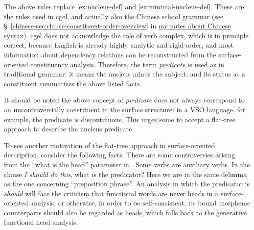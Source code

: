 \documentclass{article}
\newcommand*{\citesec}[1]{\S~{#1}}
\newcommand*{\term}[1]{\emph{#1}}
\newcommand*{\corpus}[1]{\emph{#1}}
\newcommand{\chinese}{\href{../Chinese/main.pdf}{my notes about Chinese syntax}}
\begin{document}
The above rules replace \eqref{ex:nucleus-def} and \eqref{ex:minimal-nucleus-def}.
These are the rules used in \ac{cgel}, and actually also the Chinese school grammar
(see \citesec{\ref{chinese-sec:clause-constituent-order-overview}} in \chinese).
\ac{cgel} does not acknowledge the role of verb complex,
which is in principle correct, 
because English is already highly analytic and rigid-order,
and most information about dependency relations can be reconstructed 
from the surface-oriented constituency analysis.
Therefore, the term \term{predicate} is used as in traditional grammar:
it means the nucleus minus the subject, 
and its status as a constituent summarizes the above listed facts.

It should be noted the above concept of \term{predicate} does not always correspond to 
an uncontroversially constituent in the surface structure:
in a VSO language, for example, the predicate is discontinuous.
This urges some to accept a flat-tree approach to describe the nucleus predicate.

To see another motivation of the flat-tree approach in surface-oriented description, consider the following facts.
There are some controversies arising from the ``what is the head'' parameter in .
Some verbs are auxiliary verbs.
In the clause \corpus{I should do this},
what is the predicator?
Here we are in the same delimma as the one concerning ``preposition phrase''.
An analysis in which the predicator is \corpus{should} will face the criticism 
that functional words are never heads in a surface-oriented analysis,
or otherwise, in order to be self-consistent,
its bound morpheme counterparts should also be regarded as heads,
which falls back to the generative functional head analysis.
\end{document}
